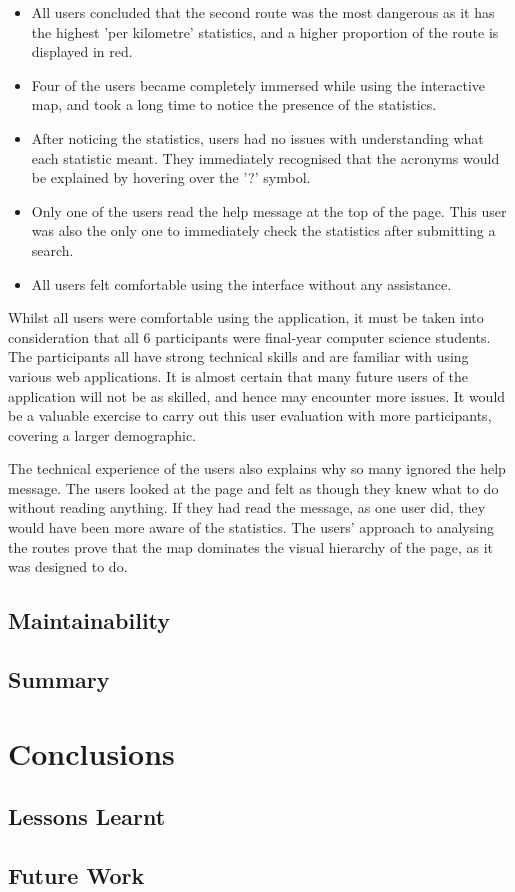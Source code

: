 \documentclass[authoryearcitations]{UoYCSproject}
\begin{document}
\begin{itemize}
	\item All users concluded that the second route was the most dangerous as it has the highest 'per kilometre' statistics, and a higher proportion of the route is displayed in red.
	\item Four of the users became completely immersed while using the interactive map, and took a long time to notice the presence of the statistics. 
	\item After noticing the statistics, users had no issues with understanding what each statistic meant. They immediately recognised that the acronyms would be explained by hovering over the '?' symbol.
	\item Only one of the users read the help message at the top of the page. This user was also the only one to immediately check the statistics after submitting a search.
	\item All users felt comfortable using the interface without any assistance.
\end{itemize}

Whilst all users were comfortable using the application, it must be taken into consideration that all 6 participants were final-year computer science students. The participants all have strong technical skills and are familiar with using various web applications. It is almost certain that many future users of the application will not be as skilled, and hence may encounter more issues. It would be a valuable exercise to carry out this user evaluation with more participants, covering a larger demographic.

The technical experience of the users also explains why so many ignored the help message. The users looked at the page and felt as though they knew what to do without reading anything. If they had read the message, as one user did, they would have been more aware of the statistics. The users' approach to analysing the routes prove that the map dominates the visual hierarchy of the page, as it was designed to do.

\section{Maintainability}

\section{Summary}


\chapter{Conclusions}

\section{Lessons Learnt}

\section{Future Work}



\end{document}

